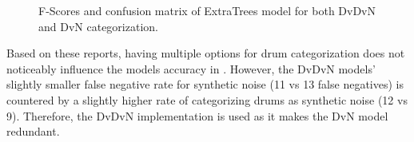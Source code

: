 \documentclass[\main/thesis.tex]{subfiles}
\begin{document}
\begin{figure}[htbp]
\begin{center}
\end{center}


\caption{F-Scores and confusion matrix of ExtraTrees model for both DvDvN and DvN categorization.}
\label{fig:conf_f1_dvn}
\end{figure}

Based on these reports, having multiple options for drum categorization does not noticeably influence the models accuracy in \decfirst. However, the DvDvN models' slightly smaller false negative rate for synthetic noise (11 vs 13 false negatives) is countered by a slightly higher rate of categorizing drums as synthetic noise (12 vs 9). Therefore, the DvDvN implementation is used as it makes the DvN model redundant.
\end{document}
